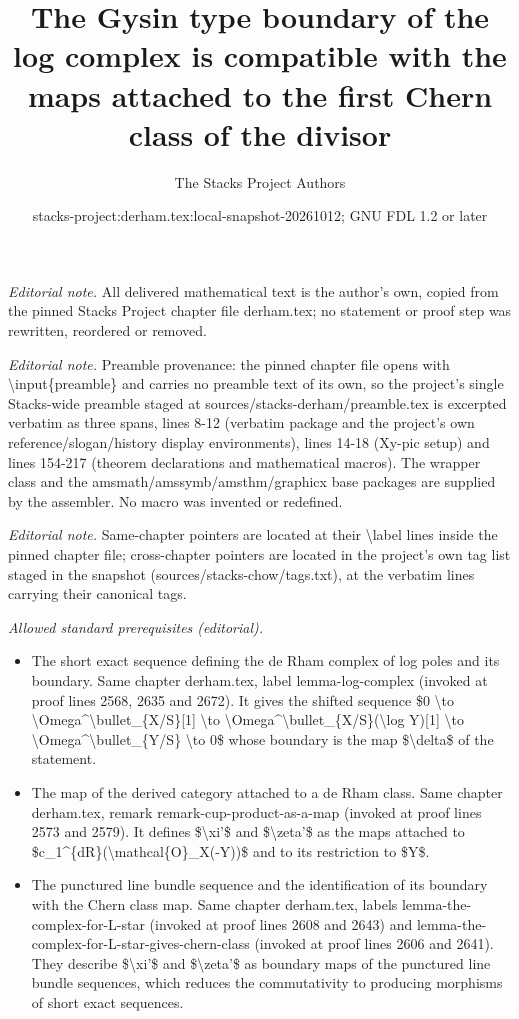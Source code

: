 \documentclass[10pt,a4paper]{amsart}
\title{The Gysin type boundary of the log complex is compatible with the maps attached to the first Chern class of the divisor}
\author{The Stacks Project Authors}
\date{stacks-project:derham.tex:local-snapshot-20261012; GNU FDL 1.2 or later}
\theoremstyle{plain}
\theoremstyle{definition}
\theoremstyle{remark}
\numberwithin{equation}{subsection}
\begin{document}
\maketitle
\noindent\textit{Editorial note.} All delivered mathematical text is the author's own, copied from the pinned Stacks Project chapter file derham.tex; no statement or proof step was rewritten, reordered or removed.\par\medskip
\noindent\textit{Editorial note.} Preamble provenance: the pinned chapter file opens with \textbackslash{}input\{preamble\} and carries no preamble text of its own, so the project's single Stacks-wide preamble staged at sources/stacks-derham/preamble.tex is excerpted verbatim as three spans, lines 8-12 (verbatim package and the project's own reference/slogan/history display environments), lines 14-18 (Xy-pic setup) and lines 154-217 (theorem declarations and mathematical macros). The wrapper class and the amsmath/amssymb/amsthm/graphicx base packages are supplied by the assembler. No macro was invented or redefined.\par\medskip
\noindent\textit{Editorial note.} Same-chapter pointers are located at their \textbackslash{}label lines inside the pinned chapter file; cross-chapter pointers are located in the project's own tag list staged in the snapshot (sources/stacks-chow/tags.txt), at the verbatim lines carrying their canonical tags.\par\medskip
\noindent\textit{Allowed standard prerequisites (editorial).}\begin{itemize}
\item The short exact sequence defining the de Rham complex of log poles and its boundary. Same chapter derham.tex, label lemma-log-complex (invoked at proof lines 2568, 2635 and 2672). It gives the shifted sequence \$0 \textbackslash{}to \textbackslash{}Omega\textasciicircum{}\textbackslash{}bullet\_\{X/S\}[1] \textbackslash{}to \textbackslash{}Omega\textasciicircum{}\textbackslash{}bullet\_\{X/S\}(\textbackslash{}log Y)[1] \textbackslash{}to \textbackslash{}Omega\textasciicircum{}\textbackslash{}bullet\_\{Y/S\} \textbackslash{}to 0\$ whose boundary is the map \$\textbackslash{}delta\$ of the statement.
\item The map of the derived category attached to a de Rham class. Same chapter derham.tex, remark remark-cup-product-as-a-map (invoked at proof lines 2573 and 2579). It defines \$\textbackslash{}xi'\$ and \$\textbackslash{}zeta'\$ as the maps attached to \$c\_1\textasciicircum{}\{dR\}(\textbackslash{}mathcal\{O\}\_X(-Y))\$ and to its restriction to \$Y\$.
\item The punctured line bundle sequence and the identification of its boundary with the Chern class map. Same chapter derham.tex, labels lemma-the-complex-for-L-star (invoked at proof lines 2608 and 2643) and lemma-the-complex-for-L-star-gives-chern-class (invoked at proof lines 2606 and 2641). They describe \$\textbackslash{}xi'\$ and \$\textbackslash{}zeta'\$ as boundary maps of the punctured line bundle sequences, which reduces the commutativity to producing morphisms of short exact sequences.
\end{itemize}\medskip
\end{document}
